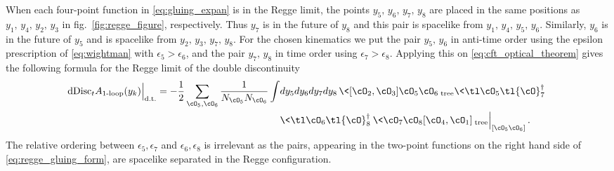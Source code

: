 When each four-point function in \eqref{eq:gluing_expan} is in the Regge limit, the points $y_{5},\,y_{6},\,y_{7},\,y_{8}$ are placed in the same positions as $y_{1},\,y_{4},\,y_{2},\,y_{3}$ in fig.\ \ref{fig:regge_figure}, respectively. Thus $y_7$ is in the future of $y_8$ and this pair is spacelike from $y_1 ,\, y_4 ,\, y_5 ,\, y_6$. Similarly, $y_6$ is in the future of $y_5$ and is spacelike from $y_2 ,\, y_3 ,\, y_7 ,\, y_8$. 
For the chosen kinematics
we put the pair $y_5 ,\, y_6$ in anti-time order  using the epsilon prescription of \eqref{eq:wightman} with $\epsilon_5 > \epsilon_6$, and the pair $y_7 ,\, y_8$ in time order using $\epsilon_7 > \epsilon_8$. Applying this on \eqref{eq:cft_optical_theorem} gives the following formula for the Regge limit of the double discontinuity
\begin{align}
\dDisc_t A_{\text{1-loop}}(y_k) \Big|_{\text{d.t.}} = -\frac{1}{2}
\sum\limits_{\cO_5, \cO_6}  \frac{1}{N_{\cO_5}N_{\cO_6}}\int & dy_5 dy_6 dy_7 dy_8\, \< [\cO_2 ,\cO_3 ] \cO_5 \cO_6 \>_{\text{tree}} \< \tl \cO_5 \tl{\cO}_{7}^{\dag}\>  \nonumber\\
&\<\tl \cO_6 \tl{\cO}_{8}^{\dag}\>
		 \< \cO_7 \cO_8 [\cO_4 , \cO_1]\>_{\text{tree}} \Big|_{\left[\cO_5\cO_6\right]} \,.
\label{eq:regge_gluing_form}
\end{align}
The relative ordering between $\epsilon_5 ,\epsilon_7$ and $\epsilon_6 ,\epsilon_8$ is irrelevant as the pairs, appearing in the two-point functions on the right hand side of \eqref{eq:regge_gluing_form}, are spacelike separated in the Regge configuration.

